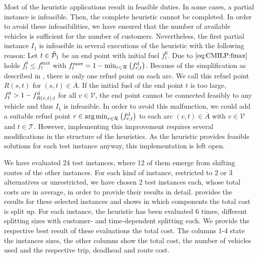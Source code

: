 Most of the heuristic applications result in feasible duties. In some cases, a partial instance is infeasible. Then, the complete heuristic cannot be completed. In order to avoid these infeasibilities, we have ensured that the number of available vehicles is sufficient for the number of customers. Nevertheless, the first partial instance $I_1$ is infeasible in several executions of the heuristic with the following reason: Let $t\in\hat{\mathcal{P}}_1$ be an end point with initial fuel $f^0_t$. Due to $\eqref{eq:CMILP:fmax}$ holds ${f^0_t\leq f^{\max}_t}$ with ${f^{\max}_t = 1 - \min_{r\in\mathcal{R}}\left(f^{\operatorname{d}}_{r,t}\right)}$. Because of the simplification as described in , there is only one refuel point on each arc. We call this refuel point $R(s,t)$ for ${(s,t)\in\overline{A}}$. If the initial fuel of the end point $t$ is too large, \ie ${f^0_t > 1 - f^{\operatorname{d}}_{R(v,t),t}}$ for all ${v\in\mathcal{V}}$, the end point cannot be connected feasibly to any vehicle and thus $I_1$ is infeasible. In order to avoid this malfunction, we could add a suitable refuel point ${r\in\operatorname*{arg\,min}_{r\in\mathcal{R}}\left(f^{\operatorname{d}}_{r,t}\right)}$ to each arc ${(v,t)\in\overline{A}}$ with ${v\in\mathcal{V}}$ and ${t\in\mathcal{T}}$. However, implementing this improvement requires several modifications in the structure of the heuristics. As the heuristic provides feasible solutions for each test instance anyway, this implementation is left open.

We have evaluated 24 test instances, where 12 of them emerge from shifting routes of the other instances. For each kind of instance, \ie restricted to 2 or 3 alternatives or unrestricted, we have chosen 2 test instances each, whose total costs are in average, in order to provide their results in detail.  provides the results for these selected instances and shows in which components the total cost is split up. For each instance, the heuristic has been evaluated 6 times,  different splitting sizes with customer- and time-dependent splitting each. We provide the respective best result of these evaluations \wrt the total cost. The columns 1-4 state the instances sizes, the other columns show the total cost, the number of vehicles used and the respective trip, deadhead and route cost.

